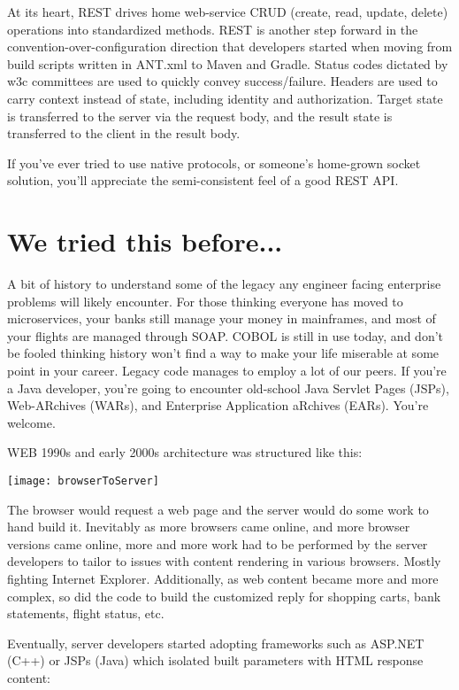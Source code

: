 At its heart, REST drives home web-service CRUD (create, read, update, delete) operations into standardized methods.  REST is another step forward in the convention-over-configuration direction that developers started when moving from build scripts written in ANT.xml to Maven and Gradle.  Status codes dictated by w3c committees are used to quickly convey success/failure.  Headers are used to carry context instead of state, including identity and authorization.  Target state is transferred to the server via the request body, and the result state is transferred to the client in the result body.

If you've ever tried to use native protocols, or someone's home-grown socket solution, you'll appreciate the semi-consistent feel of a good REST API.

\section{We tried this before...}

A bit of history to understand some of the legacy any engineer facing enterprise problems will likely encounter.  For those thinking everyone has moved to microservices, your banks still manage your money in mainframes, and most of your flights are managed through SOAP.  COBOL is still in use today, and don't be fooled thinking history won't find a way to make your life miserable at some point in your career.  Legacy code manages to employ a lot of our peers.  If you're a Java developer, you're going to encounter old-school Java Servlet Pages (JSPs), Web-ARchives (WARs), and Enterprise Application aRchives (EARs).  You're welcome.

WEB 1990s and early 2000s architecture was structured like this:

\texttt{[image: browserToServer]}

The browser would request a web page and the server would do some work to hand build it.  Inevitably as more browsers came online, and more browser versions came online, more and more work had to be performed by the server developers to tailor to issues with content rendering in various browsers. Mostly fighting Internet Explorer.  Additionally, as web content became more and more complex, so did the code to build the customized reply for shopping carts, bank statements, flight status, etc.

Eventually, server developers started adopting frameworks such as ASP.NET (C++) or JSPs (Java) which isolated built parameters with HTML response content:

